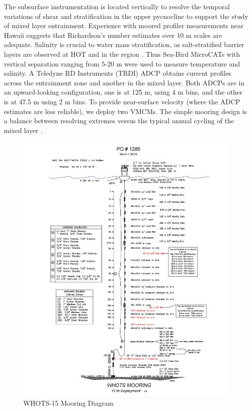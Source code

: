The subsurface instrumentation is located vertically to resolve the temporal variations of shear and stratification in the upper pycnocline to support the study of mixed layer entrainment. Experience with moored profiler measurements near Hawaii suggests that Richardson's number estimates over 10 m scales are adequate. Salinity is crucial to water mass stratification, as salt-stratified barrier layers are observed at HOT and in the region \parencite{Kara2000}. Thus Sea-Bird MicroCATs with vertical separation ranging from 5-20 m were used to measure temperature and salinity. A Teledyne RD Instruments (TRDI) ADCP obtains current profiles across the entrainment zone and another in the mixed layer. Both ADCPs are in an upward-looking configuration, one is at 125 m, using 4 m bins, and the other is at 47.5 m using 2 m bins. To provide near-surface velocity (where the ADCP estimates are less reliable), we deploy two VMCMs. The simple mooring design is a balance between resolving extremes versus the typical annual cycling of the mixed layer \parencite{Plueddemann2006,Santiago-Mandujano2007}.

\begin{figure}[h!]
	\begin{center}
		 \includegraphics{2.Figures/diagram/whots_diagram.png}
		 \caption{WHOTS-15 Mooring Diagram}
		 \label{fig:whots_diagram}
	\end{center}
\end{figure}                                      


